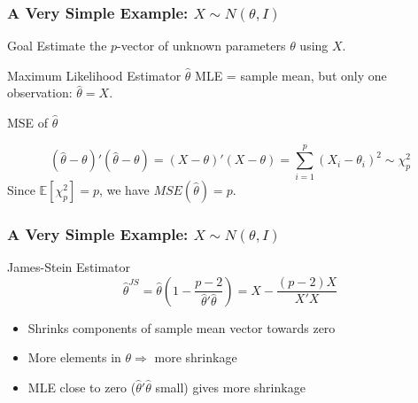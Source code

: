 \begin{frame}
  \frametitle{A Very Simple Example: $X \sim N(\theta, I)$}

  \begin{block}{Goal}
   Estimate the $p$-vector of unknown parameters $\theta$ using $X$.
  \end{block}

  \begin{block}{Maximum Likelihood Estimator $\widehat{\theta}$}
MLE = sample mean, but only one observation: $\hat{\theta} = X$.
  \end{block}

  \begin{block}{MSE of $\widehat{\theta}$}
    
    \vspace{-1em}
\begin{equation*}
  \left( \hat{\theta} - \theta \right)' \left( \hat{\theta}- \theta \right) = \left( X - \theta \right)'\left( X-\theta \right)= \sum_{i = 1}^{p} \left( X_{i} - \theta_i \right)^2 \sim \chi^2_p 
\end{equation*}
Since $\mathbb{E}[\chi^2_p]=p$, we have $MSE(\hat{\theta})=p$.
  \end{block}

\end{frame}
\begin{frame}
  \frametitle{A Very Simple Example: $X \sim N(\theta, I)$}

  \begin{block}{James-Stein Estimator}
\begin{equation*}
  \hat{\theta}^{JS} = \hat{\theta}\left( 1 - \frac{p-2}{\hat{\theta}'\hat{\theta}} \right) = X - \frac{\left( p-2 \right)X}{X'X}
\end{equation*}
\begin{itemize}
  \item Shrinks components of sample mean vector towards zero
  \item More elements in $\theta \Rightarrow$ more shrinkage 
  \item MLE close to zero ($\widehat{\theta}'\widehat{\theta}$ small)    gives more shrinkage
\end{itemize}
  \end{block}
\end{frame}
